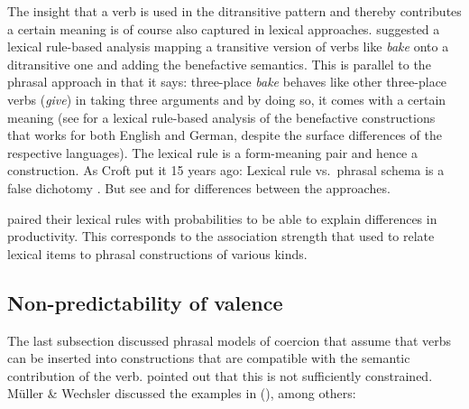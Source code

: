 \documentclass[output=paper
	        ,collection
	        ,collectionchapter
 	        ,biblatex
                ,babelshorthands
                ,newtxmath
                ,draftmode
                ,colorlinks, citecolor=brown
]{langscibook}
\begin{document}
The insight that a verb is used in the ditransitive pattern and thereby contributes a certain
meaning is of course also captured in lexical approaches. \citet{BC99a} suggested a lexical
rule-based analysis mapping a transitive version of verbs like \emph{bake} onto a ditransitive one
and adding the benefactive semantics. This is parallel to the phrasal approach in that it says:
three-place \emph{bake} behaves like other three-place verbs (\eg \emph{give}) in taking three
arguments and by doing so, it comes with a certain meaning (see \citealt{MuellerLFGphrasal} for a
lexical rule-based analysis of the benefactive constructions that works for both English and German,
despite the surface differences of the respective languages). The lexical rule is a form-meaning pair
and hence a construction. As Croft put it 15 years ago: Lexical rule vs.\ phrasal schema is a false
dichotomy \citep{Croft2003a}. But see \citet{MuellerLFGphrasal,Mueller2006d,MuellerUnifying} and \citet{MWArgSt} for
differences between the approaches.

\citet{BC99a} paired their lexical rules with probabilities to be able to explain differences in
productivity. This corresponds to the association strength that \citet[]{vanTrijp2011a} used to relate
lexical items to phrasal constructions of various kinds.

\subsection{Non-predictability of valence}

The last subsection discussed phrasal models of coercion that assume that verbs can be inserted
into constructions that are compatible with the semantic contribution of the verb. \citet[Section~7.4]{MWArgSt}
pointed out that this is not sufficiently constrained. Müller \& Wechsler discussed the examples in
(), among others:
\end{document}
